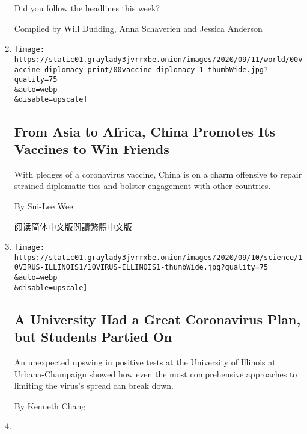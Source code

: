 \begin{enumerate}
  Did you follow the headlines this week?

  Compiled by Will Dudding, Anna Schaverien and Jessica Anderson
\item
  \href{/2020/09/11/business/china-vaccine-diplomacy.html}{}

  \texttt{[image: https://static01.graylady3jvrrxbe.onion/images/2020/09/11/world/00vaccine-diplomacy-print/00vaccine-diplomacy-1-thumbWide.jpg?quality=75\\\&auto=webp\\\&disable=upscale]}

  \hypertarget{from-asia-to-africa-china-promotes-its-vaccines-to-win-friends}{%
  \subsection{From Asia to Africa, China Promotes Its Vaccines to Win
  Friends}\label{from-asia-to-africa-china-promotes-its-vaccines-to-win-friends}}

  With pledges of a coronavirus vaccine, China is on a charm offensive
  to repair strained diplomatic ties and bolster engagement with other
  countries.

  By Sui-Lee Wee

  \href{https://cn.nytimes3xbfgragh.onion/business/20200911/china-vaccine-diplomacy/}{阅读简体中文版}\href{https://cn.nytimes3xbfgragh.onion/business/20200911/china-vaccine-diplomacy/zh-hant/}{閱讀繁體中文版}
\item
  \href{/2020/09/10/health/university-illinois-covid.html}{}

  \texttt{[image: https://static01.graylady3jvrrxbe.onion/images/2020/09/10/science/10VIRUS-ILLINOIS1/10VIRUS-ILLINOIS1-thumbWide.jpg?quality=75\\\&auto=webp\\\&disable=upscale]}

  \hypertarget{a-university-had-a-great-coronavirus-plan-but-students-partied-on}{%
  \subsection{A University Had a Great Coronavirus Plan, but Students
  Partied
  On}\label{a-university-had-a-great-coronavirus-plan-but-students-partied-on}}

  An unexpected upswing in positive tests at the University of Illinois
  at Urbana-Champaign showed how even the most comprehensive approaches
  to limiting the virus's spread can break down.

  By Kenneth Chang
\item
  \href{/2020/09/10/climate/la-nina-southwest-drought.html}{}


\end{enumerate}
